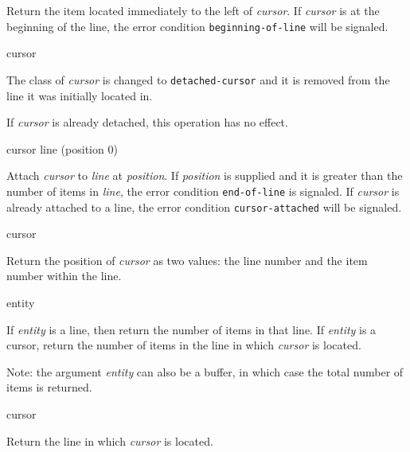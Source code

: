 Return the item located immediately to the left of \textit{cursor}.
If \emph{cursor} is at the beginning of the line, the error condition
\texttt{beginning-of-line} will be signaled.

 {cursor}

The class of \textit{cursor} is changed to \texttt{detached-cursor}
and it is removed from the line it was initially located in. 

If \textit{cursor} is already detached, this operation has no effect.

 {cursor line \optional (position 0)}

Attach \textit{cursor} to \textit{line} at \textit{position}.  If
\textit{position} is supplied and it is greater than the number of
items in \textit{line}, the error condition \texttt{end-of-line} is
signaled.  If \textit{cursor} is already attached to a line, the error
condition \texttt{cursor-attached} will be signaled.

 {cursor}

Return the position of \textit{cursor} as two values: the line number
and the item number within the line. 

 {entity}

If \textit{entity} is a line, then return the number of items in that
line.  If \textit{entity} is a cursor, return the number of items in
the line in which \textit{cursor} is located.

Note: the argument \textit{entity} can also be a buffer, in which case
the total number of items is returned.

 {cursor}

Return the line in which \textit{cursor} is located. 
